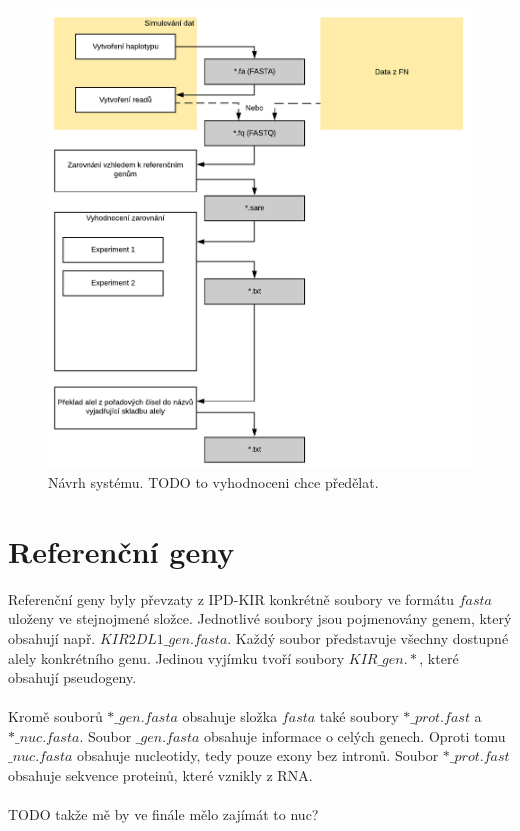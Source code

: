 \documentclass[czech,DP]{thesiskiv}
\numberwithin{equation}{section}
\begin{document}
\begin{figure}[H]
		\centering
		\includegraphics[width=\textwidth]{./img/navrh_systemu.pdf}
		\caption{Návrh systému. TODO to vyhodnoceni chce předělat. }
		\label{fig:navrh_systemu}
\end{figure}

\section{Referenční geny}
Referenční geny byly převzaty z IPD-KIR \cite{imgt_hla_database} konkrétně soubory ve formátu $fasta$ uloženy ve stejnojmené složce. Jednotlivé soubory jsou pojmenovány genem, který obsahují např. $KIR2DL1\_gen.fasta$. Každý soubor představuje všechny dostupné alely konkrétního genu. Jedinou vyjímku tvoří soubory $KIR\_gen.*$, které obsahují pseudogeny. 
\\
\\
Kromě souborů $*\_gen.fasta$ obsahuje složka $fasta$ také soubory $*\_prot.fast$ a $*\_nuc.fasta$. Soubor $\_gen.fasta$ obsahuje informace o celých genech. Oproti tomu $\_nuc.fasta$ obsahuje nucleotidy, tedy pouze exony bez intronů. Soubor $*\_prot.fast$ obsahuje sekvence proteinů, které vznikly z RNA. 
\\
\\
TODO takže mě by ve finále mělo zajímát to nuc? 
\\
\\
\end{document}
